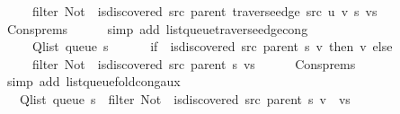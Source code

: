 \begin{isabellebody}
\ \ \ \ \ filter\ {\isacharparenleft}{\kern0pt}Not\ {\isasymcirc}\ is{\isacharunderscore}{\kern0pt}discovered\ src\ {\isacharparenleft}{\kern0pt}parent\ {\isacharparenleft}{\kern0pt}traverse{\isacharunderscore}{\kern0pt}edge\ src\ u\ v\ s{\isacharparenright}{\kern0pt}{\isacharparenright}{\kern0pt}{\isacharparenright}{\kern0pt}\ vs{\isachardoublequoteclose}\isanewline
\ \ \ \ \isamarkupfalse%
\ Cons{\isachardot}{\kern0pt}prems{\isacharparenleft}{\kern0pt}{}{\isacharparenright}{\kern0pt}\isanewline
\ \ \ \ \isamarkupfalse%
\ {\isacharparenleft}{\kern0pt}simp\ add{\isacharcolon}{\kern0pt}\ list{\isacharunderscore}{\kern0pt}queue{\isacharunderscore}{\kern0pt}traverse{\isacharunderscore}{\kern0pt}edge{\isacharunderscore}{\kern0pt}cong{\isacharparenright}{\kern0pt}\isanewline
\ \ \isamarkupfalse%
\ \isamarkupfalse%
\isanewline
\ \ \ \ {\isachardoublequoteopen}{\isachardot}{\kern0pt}{\isachardot}{\kern0pt}{\isachardot}{\kern0pt}\ {\isacharequal}{\kern0pt}\isanewline
\ \ \ \ \ Q{\isacharunderscore}{\kern0pt}list\ {\isacharparenleft}{\kern0pt}queue\ s{\isacharparenright}{\kern0pt}\ {\isacharat}{\kern0pt}\isanewline
\ \ \ \ \ {\isacharparenleft}{\kern0pt}if\ {\isasymnot}\ is{\isacharunderscore}{\kern0pt}discovered\ src\ {\isacharparenleft}{\kern0pt}parent\ s{\isacharparenright}{\kern0pt}\ v\ then\ {\isacharbrackleft}{\kern0pt}v{\isacharbrackright}{\kern0pt}\ else\ {\isacharbrackleft}{\kern0pt}{\isacharbrackright}{\kern0pt}{\isacharparenright}{\kern0pt}\ {\isacharat}{\kern0pt}\isanewline
\ \ \ \ \ filter\ {\isacharparenleft}{\kern0pt}Not\ {\isasymcirc}\ is{\isacharunderscore}{\kern0pt}discovered\ src\ {\isacharparenleft}{\kern0pt}parent\ s{\isacharparenright}{\kern0pt}{\isacharparenright}{\kern0pt}\ vs{\isachardoublequoteclose}\isanewline
\ \ \ \ \isamarkupfalse%
\ Cons{\isachardot}{\kern0pt}prems{\isacharparenleft}{\kern0pt}{}{\isacharcomma}{\kern0pt}\ {}{\isacharparenright}{\kern0pt}\isanewline
\ \ \ \ \isamarkupfalse%
\ {\isacharparenleft}{\kern0pt}simp\ add{\isacharcolon}{\kern0pt}\ list{\isacharunderscore}{\kern0pt}queue{\isacharunderscore}{\kern0pt}fold{\isacharunderscore}{\kern0pt}cong{\isacharunderscore}{\kern0pt}aux{\isacharparenright}{\kern0pt}\isanewline
\ \ \isamarkupfalse%
\ \isamarkupfalse%
\ {\isachardoublequoteopen}{\isachardot}{\kern0pt}{\isachardot}{\kern0pt}{\isachardot}{\kern0pt}\ {\isacharequal}{\kern0pt}\ Q{\isacharunderscore}{\kern0pt}list\ {\isacharparenleft}{\kern0pt}queue\ s{\isacharparenright}{\kern0pt}\ {\isacharat}{\kern0pt}\ filter\ {\isacharparenleft}{\kern0pt}Not\ {\isasymcirc}\ is{\isacharunderscore}{\kern0pt}discovered\ src\ {\isacharparenleft}{\kern0pt}parent\ s{\isacharparenright}{\kern0pt}{\isacharparenright}{\kern0pt}\ {\isacharparenleft}{\kern0pt}v\ {\isacharhash}{\kern0pt}\ vs{\isacharparenright}{\kern0pt}{\isachardoublequoteclose}\isanewline

\end{isabellebody}
